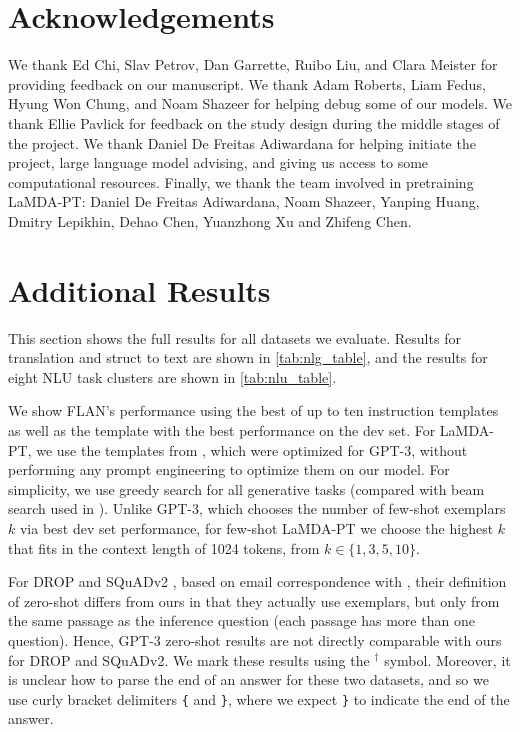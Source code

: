 \documentclass{article} %
\newcommand{\baselm}{LaMDA-PT}
\begin{document}
\section*{Acknowledgements}
We thank Ed Chi, Slav Petrov, Dan Garrette, Ruibo Liu, and Clara Meister for providing feedback on our manuscript. 
We thank Adam Roberts, Liam Fedus, Hyung Won Chung, and Noam Shazeer for helping debug some of our models. 
We thank Ellie Pavlick for feedback on the study design during the middle stages of the project.  
We thank Daniel De Freitas Adiwardana for helping initiate the project, large language model advising, and giving us access to some computational resources.
Finally, we thank the team involved in pretraining \baselm{}: Daniel De Freitas Adiwardana, Noam Shazeer, Yanping Huang, Dmitry Lepikhin, Dehao Chen, Yuanzhong Xu and Zhifeng Chen.


\clearpage 



\newpage 
\appendix

\newcommand{\trainsize}[0]{30,000}
\newcommand{\devsize}[0]{200}

\section{Additional Results}\label{sec:supp_all_results}




This section shows the full results for all datasets we evaluate.
Results for translation and struct to text are shown in \cref{tab:nlg_table}, and the results for eight NLU task clusters are shown in \cref{tab:nlu_table}.

We show FLAN's performance using the best of up to ten instruction templates as well as the template with the best performance on the dev set. 
For \baselm{}, we use the templates from \citet{brown2020language}, which were optimized for GPT-3, without performing any prompt engineering to optimize them on our model. 
For simplicity, we use greedy search for all generative tasks (compared with beam search used in \citet{brown2020language}). 
Unlike GPT-3, which chooses the number of few-shot exemplars $k$ via best dev set performance, for few-shot \baselm{} we choose the highest $k$ that fits in the context length of 1024 tokens, from $k \in \{1, 3, 5, 10\}$. 

For DROP \citep{Dua2019DROP} and SQuADv2 \citep{rajpurkar-etal-2018-know}, based on email correspondence with \citet{brown2020language}, their definition of zero-shot differs from ours in that they actually use exemplars, but only from the same passage as the inference question (each passage has more than one question). 
Hence, GPT-3 zero-shot results are not directly comparable with ours for DROP and SQuADv2.
We mark these results using the $^{\dagger}$ symbol.
Moreover, it is unclear how to parse the end of an answer for these two datasets, and so we use curly bracket delimiters \texttt{\{} and \texttt{\}}, where we expect \texttt{\}} to indicate the end of the answer.
\end{document}

